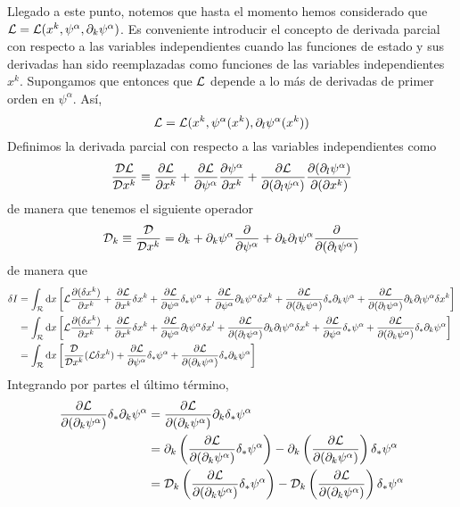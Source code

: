Llegado a este punto, notemos que hasta el momento hemos considerado que $\mathcal{L}=\mathcal{L}(x^k,\psi^\alpha,\partial_k\psi^\alpha)$. Es conveniente introducir el concepto de derivada parcial con respecto a las variables independientes cuando las funciones de estado y sus derivadas han sido reemplazadas como funciones de las variables independientes $x^k$. Supongamos que entonces que $\mathcal{L}$ depende a lo más de derivadas de primer orden en $\psi^\alpha$. Así,
\begin{equation}
  \mathcal{L} = \mathcal{L} (x^k,\psi^\alpha (x^k),\partial_l\psi^\alpha (x^k))
\end{equation}
Definimos la derivada parcial con respecto a las variables independientes como
\begin{equation}
	\frac{\mathcal{D}\mathcal{L}}{\mathcal{D} x^k}\equiv \pdv{\mathcal{L}}{x^k}+\pdv{\mathcal{L}}{\psi^\alpha}\pdv{\psi^\alpha}{x^k}+\pdv{\mathcal{L}}{(\partial_l\psi^\alpha)}\pdv{(\partial_l\psi^\alpha)}{(\partial x^k)}
\end{equation}
de manera que tenemos el siguiente operador
\begin{equation}
  \mathcal{D} _k\equiv \frac{\mathcal{D}}{\mathcal{D} x^k}=\partial _k+\partial_k\psi^\alpha\pdv{\psi^\alpha}+\partial_k\partial_l\psi^\alpha\pdv{(\partial_l\psi^\alpha)}
\end{equation}
de manera que
\begin{align*}
  \delta I&=\int_{\mathcal{R}} \dd x\left[\mathcal{L} \pdv{(\delta x^k)}{x^k}+\pdv{\mathcal{L}}{x^k}\delta x^k+\pdv{\mathcal{L}}{\psi^\alpha }\delta_*\psi^\alpha +\pdv{\mathcal{L}}{\psi^\alpha}\partial_k\psi^\alpha \delta x^k+\pdv{\mathcal{L}}{(\partial_k\psi^\alpha)}\delta_*\partial_k\psi^\alpha +\pdv{\mathcal{L}}{(\partial_l\psi^\alpha)}\partial_k\partial_l\psi^\alpha \delta x^k\right]\\
  &=\int_{\mathcal{R}} \dd x\left[\mathcal{L} \pdv{(\delta x^k)}{x^k}+\pdv{\mathcal{L}}{x^k}\delta x^k+\pdv{\mathcal{L}}{\psi^\alpha}\partial_l\psi^\alpha \delta x^l+\pdv{\mathcal{L}}{(\partial_l\psi^\alpha)}\partial_k\partial_l\psi^\alpha \delta x^k+\pdv{\mathcal{L}}{\psi^\alpha }\delta_*\psi^\alpha+\pdv{\mathcal{L}}{(\partial_k\psi^\alpha)}\delta_*\partial_k\psi^\alpha\right]\\
  &=\int_{\mathcal{R}} \dd x\left[\frac{\mathcal{D}}{\mathcal{D} x^k}(\mathcal{L}\delta x^k)+\pdv{\mathcal{L}}{\psi^\alpha }\delta_*\psi^\alpha+\pdv{\mathcal{L}}{(\partial_k\psi^\alpha)}\delta_*\partial_k\psi^\alpha\right]
\end{align*}
Integrando por partes el último término,
\begin{align}
  \pdv{\mathcal{L}}{(\partial_k\psi^\alpha)}\delta_*\partial_k\psi^\alpha&=\pdv{\mathcal{L}}{(\partial_k\psi^\alpha)}\partial_k\delta_*\psi^\alpha\\
  &=\partial_k\left(\pdv{\mathcal{L}}{(\partial_k\psi^\alpha)}\delta_*\psi^\alpha\right)-\partial_k\left(\pdv{\mathcal{L}}{(\partial_k\psi^\alpha)}\right)\delta_*\psi^\alpha\\
  &=\mathcal{D}_k\left(\pdv{\mathcal{L}}{(\partial_k\psi^\alpha)}\delta_*\psi^\alpha\right)-\mathcal{D}_k\left(\pdv{\mathcal{L}}{(\partial_k\psi^\alpha)}\right)\delta_*\psi^\alpha
\end{align}

















